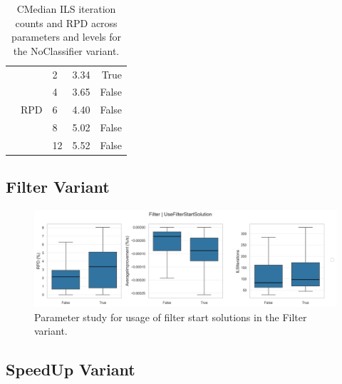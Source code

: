 \begin{table}[!ht]
\begin{tabular}{l|l|l|r|r}
		                                            & \multirow{5}{*}{RPD}           & 2                     & 3.34            & True            \\\cline{3-5}
		                                            &                                & 4                     & 3.65            & False           \\\cline{3-5}
		                                            &                                & 6                     & 4.40            & False           \\\cline{3-5}
		                                            &                                & 8                     & 5.02            & False           \\\cline{3-5}
		                                            &                                & 12                    & 5.52            & False           \\
	\end{tabular}


	\caption{CMedian ILS iteration counts and RPD across parameters and levels for the NoClassifier variant.}
	\label{tab:numerical_results_paramStudy_NOclassifiers}
\end{table}
\clearpage
\subsection{Filter Variant}
\label{app:subsec:parameterstudy_Filter}

\begin{figure}[!ht]
	\centering
	\includegraphics[width=\linewidth]{pictures/parameter_study/Filter_UseFilterStartSolution_parameter_study.png}
	\caption{Parameter study for usage of filter start solutions in the Filter variant.}
	\label{fig:parameter_study_filter}
\end{figure}


\subsection{SpeedUp Variant}
\label{app:subsec:parameterstudy_SpeedUp}

